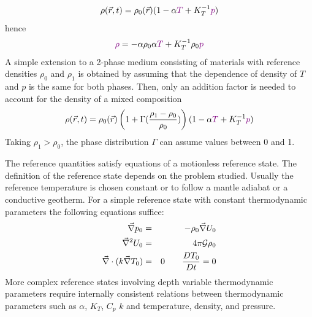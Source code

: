 \begin{equation}
\rho(\vec{r},t) = \rho_0(\vec{r}) (1-\alpha {\color{violet}T} + K_T^{-1} {\color{violet}p} )
\label{eq:md68}
\end{equation}
hence
\[
{\color{violet} \rho} = -\alpha \rho_0 \alpha {\color{violet}T} +  K_T^{-1} \rho_0 {\color{violet}p} 
\]
A simple extension to a 2-phase medium consisting of materials with reference
densities $\rho_0$ and $\rho_1$ is obtained by assuming that the dependence of density of $T$ and $p$ 
is the same for both phases. Then, only an addition factor is needed to account for the
density of a mixed composition
\begin{equation}
\rho(\vec{r},t) = \rho_0(\vec{r})\left(1+\Gamma(\frac{\rho_1-\rho_0}{\rho_0}) \right) 
(1-\alpha {\color{violet}T} + K_T^{-1} {\color{violet}p} )
\label{eq:md69}
\end{equation}
Taking $\rho_1>\rho_0$, the phase distribution $\Gamma$ can assume values between 0 and 1.


\vspace{0.5cm}

The reference quantities satisfy equations of a motionless reference state. The definition
of the reference state depends on the problem studied. Usually the reference temperature
is chosen constant or to follow a mantle adiabat or a conductive geotherm. For a simple
reference state with constant thermodynamic parameters the following equations suffice:
\begin{eqnarray}
\vec\nabla p_0 &=& -\rho_0 \vec\nabla U_0 \\
\vec\nabla^2 U_0 &=& 4\pi {\cal G} \rho_0 \\
\vec\nabla \cdot ( k \vec\nabla T_0) &=& 0 \qquad \frac{DT_0}{Dt}=0
\label{eq:md70}
\end{eqnarray}
More complex reference states involving depth variable thermodynamic parameters
require internally consistent relations between thermodynamic parameters such as
$\alpha$, $K_T$, $C_p$ $k$ and temperature, density, and pressure.

